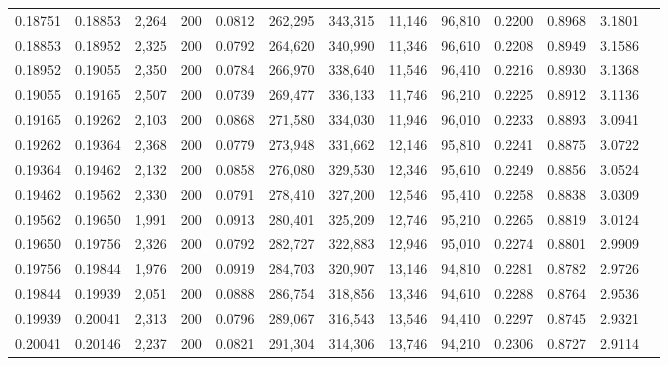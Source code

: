 \begin{tabular}{rrrrrrrrrrrrr}
0.18751 & 0.18853 &  2,264 & 200 &                                     0.0812 & 262,295 & 343,315 &  11,146 &  96,810 & 0.2200 & 0.8968 & 3.1801 \\
0.18853 & 0.18952 &  2,325 & 200 &                                     0.0792 & 264,620 & 340,990 &  11,346 &  96,610 & 0.2208 & 0.8949 & 3.1586 \\
0.18952 & 0.19055 &  2,350 & 200 &                                     0.0784 & 266,970 & 338,640 &  11,546 &  96,410 & 0.2216 & 0.8930 & 3.1368 \\
0.19055 & 0.19165 &  2,507 & 200 &                                     0.0739 & 269,477 & 336,133 &  11,746 &  96,210 & 0.2225 & 0.8912 & 3.1136 \\
0.19165 & 0.19262 &  2,103 & 200 &                                     0.0868 & 271,580 & 334,030 &  11,946 &  96,010 & 0.2233 & 0.8893 & 3.0941 \\
0.19262 & 0.19364 &  2,368 & 200 &                                     0.0779 & 273,948 & 331,662 &  12,146 &  95,810 & 0.2241 & 0.8875 & 3.0722 \\
0.19364 & 0.19462 &  2,132 & 200 &                                     0.0858 & 276,080 & 329,530 &  12,346 &  95,610 & 0.2249 & 0.8856 & 3.0524 \\
0.19462 & 0.19562 &  2,330 & 200 &                                     0.0791 & 278,410 & 327,200 &  12,546 &  95,410 & 0.2258 & 0.8838 & 3.0309 \\
0.19562 & 0.19650 &  1,991 & 200 &                                     0.0913 & 280,401 & 325,209 &  12,746 &  95,210 & 0.2265 & 0.8819 & 3.0124 \\
0.19650 & 0.19756 &  2,326 & 200 &                                     0.0792 & 282,727 & 322,883 &  12,946 &  95,010 & 0.2274 & 0.8801 & 2.9909 \\
0.19756 & 0.19844 &  1,976 & 200 &                                     0.0919 & 284,703 & 320,907 &  13,146 &  94,810 & 0.2281 & 0.8782 & 2.9726 \\
0.19844 & 0.19939 &  2,051 & 200 &                                     0.0888 & 286,754 & 318,856 &  13,346 &  94,610 & 0.2288 & 0.8764 & 2.9536 \\
0.19939 & 0.20041 &  2,313 & 200 &                                     0.0796 & 289,067 & 316,543 &  13,546 &  94,410 & 0.2297 & 0.8745 & 2.9321 \\
0.20041 & 0.20146 &  2,237 & 200 &                                     0.0821 & 291,304 & 314,306 &  13,746 &  94,210 & 0.2306 & 0.8727 & 2.9114 \\

\end{tabular}
